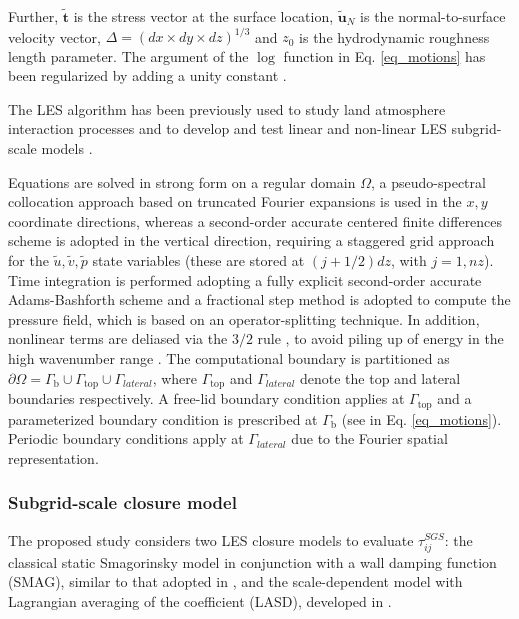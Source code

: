 Further, $\mathbf{\tilde{t}}$ is the stress vector at the surface location, $\mathbf{\tilde{u}}_N$ is the normal-to-surface velocity vector, $\Delta = (dx \times dy \times dz)^{1/3}$ and $z_0$ is the hydrodynamic roughness length parameter.
The argument of the $\log$ function in Eq. \ref{eq_motions} has been regularized by adding a unity constant \citep{Chester2007}.

The LES algorithm has been previously used to study land atmosphere interaction processes \citep{Albertson1999a, Albertson1999} and to develop and test linear and non-linear LES subgrid-scale models \citep{Meneveau1996a, Porte-Agel2000, Port2004, Bou-Zeid2005, Lu2010, Lu2013}.

Equations are solved in strong form on a regular domain $\Omega$, a pseudo-spectral collocation approach \citep{Orszag1969a, Orszag1970} based on truncated Fourier expansions is used in the $x,y$ coordinate directions, whereas a second-order accurate centered finite differences scheme is adopted in the vertical direction, requiring a staggered grid approach for the $\tilde{u},\tilde{v},\tilde{p}$ state variables (these are stored at $(j+1/2)dz$, with $j=1,nz$).
Time integration is performed adopting a fully explicit second-order accurate Adams-Bashforth scheme and a fractional step method \citep{Alexandre1968, Fluid1985} is adopted to compute the pressure field, which is based on an operator-splitting technique.
In addition, nonlinear terms are deliased via the $3/2$ rule \citep{Canuto2006}, to avoid piling up of energy in the high wavenumber range \citep{Kravchenko1997a}.
The computational boundary is partitioned as $\partial \Omega = \Gamma_{\mathrm{b}} \cup \Gamma_{\mathrm{top}} \cup \Gamma_{lateral}$, where $\Gamma_{\mathrm{top}}$ and $\Gamma_{lateral}$ denote the top and lateral boundaries respectively. A free-lid boundary condition applies at $\Gamma_{\mathrm{top}}$ and a parameterized boundary condition is prescribed at $\Gamma_{\mathrm{b}}$ (see in Eq. \ref{eq_motions}). 
Periodic boundary conditions apply at $\Gamma_{lateral}$ due to the Fourier spatial representation.

\subsubsection{Subgrid-scale closure model}
The proposed study considers two LES closure models to evaluate $\tau_{ij}^{SGS}$: the classical static Smagorinsky model \citep{Smagorinsky1963} in conjunction with a wall damping function (SMAG), similar to that adopted in \cite{Mason2006}, and the scale-dependent model with Lagrangian averaging of the coefficient (LASD), developed in \cite{Bou-Zeid2005}. 

